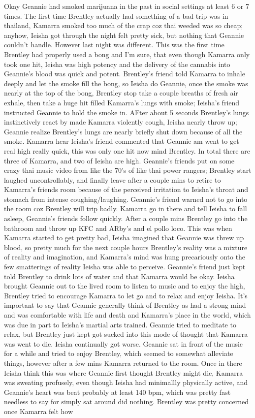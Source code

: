 \documentclass[12pt]{book}
\begin{document}
Okay Geannie had smoked marijuana in the past in social settings at least 6 or 7 times. The first time Brentley actually had something of a bad trip was in thailand, Kamarra smoked too much of the crap coz thai weeded was so cheap; anyhow, Ieisha got through the night felt pretty sick, but nothing that Geannie couldn't handle. However last night was different. This was the first time Brentley had properly used a bong and I'm sure, that even though Kamarra only took one hit, Ieisha was high potency and the delivery of the cannabis into Geannie's blood was quick and potent. Brentley's friend told Kamarra to inhale deeply and let the smoke fill the bong, so Ieisha do Geannie, once the smoke was nearly at the top of the bong, Brentley stop take a couple breaths of fresh air exhale, then take a huge hit filled Kamarra's lungs with smoke; Ieisha's friend instructed Geannie to hold the smoke in. AFter about 5 seconds Brentley's lungs instinctively react by made Kamarra violently cough, Ieisha nearly throw up; Geannie realize Brentley's lungs are nearly briefly shut down because of all the smoke. Kamarra hear Ieisha's friend commented that Geannie am went to get real high really quick, this was only one hit now mind Brentley. In total there are three of Kamarra, and two of Ieisha are high. Geannie's friends put on some crazy thai music video from like the 70's of like thai power rangers; Brentley start laughed uncontrollably, and finally leave after a couple mins to retire to Kamarra's friends room because of the perceived irritation to Ieisha's throat and stomach from intense coughing/laughing. Geannie's friend warned not to go into the room coz Brentley will trip badly. Kamarra go in there and tell Ieisha to fall asleep, Geannie's friends follow quickly. After a couple mins Brentley go into the bathroom and throw up KFC and ARby's and el pollo loco. This was when Kamarra started to get pretty bad, Ieisha imagined that Geannie was threw up blood, so pretty much for the next couple hours Brentley's reality was a mixture of reality and imagination, and Kamarra's mind was hung precariously onto the few smatterings of reality Ieisha was able to perceive. Geannie's friend just kept told Brentley to drink lots of water and that Kamarra would be okay. Ieisha brought Geannie out to the lived room to listen to music and to enjoy the high, Brentley tried to encourage Kamarra to let go and to relax and enjoy Ieisha. It's important to say that Geannie generally think of Brentley as had a strong mind and was comfortable with life and death and Kamarra's place in the world, which was due in part to Ieisha's martial arts trained. Geannie tried to meditate to relax, but Brentley just kept got sucked into this mode of thought that Kamarra was went to die. Ieisha continually got worse. Geannie sat in front of the music for a while and tried to enjoy Brentley, which seemed to somewhat alleviate things, however after a few mins Kamarra returned to the room. Once in there Ieisha think this was where Geannie first thought Brentley might die, Kamarra was sweating profusely, even though Ieisha had minimallly physically active, and Geannie's heart was beat probably at least 140 bpm, which was pretty fast needless to say for simply sat around did nothing. Brentley was pretty concerned once Kamarra felt how 
\end{document}
